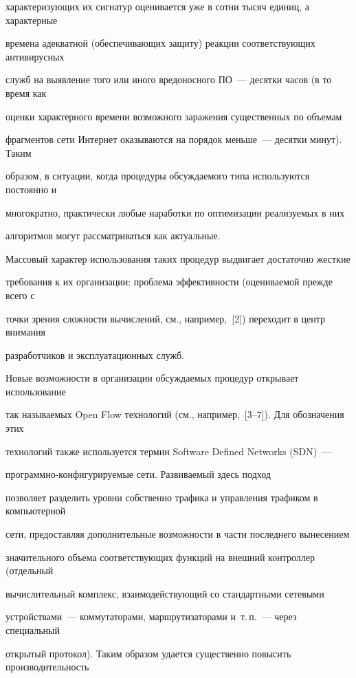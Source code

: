 характеризующих их сигнатур оценивается уже в сотни тысяч единиц, а характерные 

времена адекватной (обеспечивающих защиту) реакции соответствующих антивирусных 

служб на выявление того или иного вредоносного ПО~--- десятки часов (в то время как 

оценки характерного времени возможного заражения существенных по объемам 

фрагментов сети Интернет оказываются на порядок меньше~--- десятки минут). Таким 

образом, в ситуации, когда процедуры обсуждаемого типа используются постоянно и 

многократно, практически любые наработки по оптимизации реализуемых в них 

алгоритмов могут рассматриваться как актуальные. 

     

     Массовый характер использования таких процедур выдвигает достаточно жесткие 

требования к их организации: проблема эффективности (оцениваемой прежде всего с 

точки зрения сложности вычислений, см., например,~[2]) переходит в центр внимания 

разработчиков и эксплуатационных служб.

     

     Новые возможности в организации обсуждаемых процедур открывает использование 

так называемых Open Flow технологий (см., например,~[3--7]). Для обозначения этих 

технологий также используется термин Software Defined Networks (SDN)~--- 

     про\-грам\-мно-кон\-фи\-гу\-ри\-ру\-емые сети. Развиваемый здесь подход 

позволяет разделить уровни собственно трафика и управления трафиком в компьютерной 

сети, предоставляя дополнительные возможности в части последнего вынесением 

значительного объема соответствующих функций на внешний контроллер (отдельный 

вычислительный комплекс, взаимодействующий со стандартными сетевыми 

устройствами~--- коммутаторами, маршрутизаторами и~т.\,п.~--- через специальный 

открытый протокол). Таким образом удается существенно повысить производительность 

